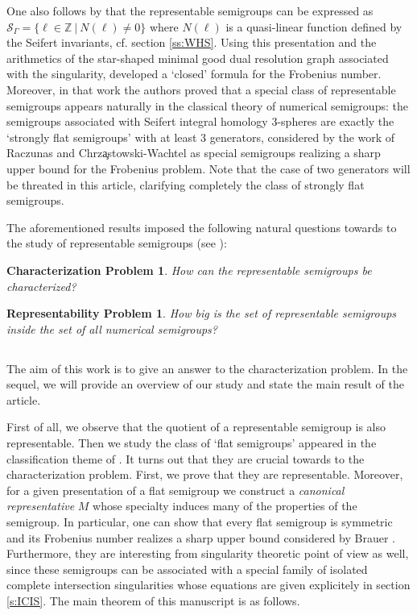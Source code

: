 \documentclass[oneside]{amsart}
\numberwithin{equation}{section}
\numberwithin{equation}{subsection}
\theoremstyle{plain}
\newtheorem*{chproblem}{Characterization Problem}
\newtheorem*{repproblem}{Representability Problem}
\theoremstyle{definition}
\def\Z{\mathbb Z}
\newcommand{\calS}{{\mathcal S}}\newcommand{\cals}{{\bf s}}\newcommand{\calst}{{\bf st}}\newcommand{\cS}{{\mathcal S}}
\renewcommand{\Z}{\mathbb{Z}}
\begin{document}
One also follows by \cite{art_pink} that the representable semigroups can be expressed as $\calS_{\Gamma}=\{\ell \in \Z \ | \ N(\ell)\neq 0\}$ where $N(\ell)$ is a quasi-linear function defined by the Seifert invariants, cf. section \ref{ss:WHS}. Using this presentation and the arithmetics of the star-shaped minimal good dual resolution graph associated with the singularity, \cite{stronglyflat} developed a `closed' formula for the Frobenius number. Moreover, in that work the authors proved that a special class of representable semigroups appears naturally in the classical theory of numerical semigroups: the semigroups associated with Seifert integral homology $3$-spheres are exactly the `strongly flat semigroups' with at least $3$ generators, considered by the work of Raczunas and Chrz\c astowski-Wachtel \cite{art_rch} as special semigroups realizing a sharp upper bound for the Frobenius problem. Note that the case of two generators will be threated in this article, clarifying completely the class of strongly flat semigroups.

\vspace{0.2cm}
The aforementioned results imposed the following natural questions towards to the study of representable semigroups (see \cite[sect. 8]{stronglyflat}): 
\begin{chproblem}
How can the representable semigroups be characterized?
\end{chproblem}

\begin{repproblem}
How big is the set of representable semigroups inside the set of all numerical semigroups? 
\end{repproblem}

\subsection{}The aim of this work is to give an answer to the characterization problem. In the sequel, we will provide an overview of our study and state the main result of the article. 

\vspace{0.2cm}
First of all, we observe that the quotient of a representable semigroup is also representable. Then we study the class of `flat semigroups' appeared in the classification theme of \cite{art_rch}. It turns out that they are crucial towards to the characterization problem. First, we prove that they are representable. Moreover, for a given presentation of a flat semigroup we construct a {\it canonical representative} $M$ whose specialty induces many of the properties of the semigroup. In particular, one can show that every flat semigroup is symmetric and its Frobenius number realizes a sharp upper bound considered by Brauer \cite{art_brauer1}. Furthermore, they are interesting from singularity theoretic point of view as well, since these semigroups can be associated with a special family of isolated complete intersection singularities whose equations are given explicitely in section \ref{s:ICIS}. The main theorem of this manuscript is as follows. 
\end{document}
